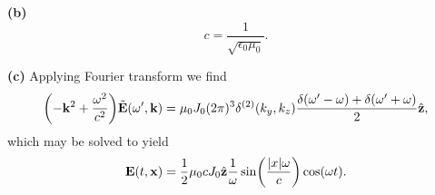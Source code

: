 \documentclass{article}
\makeatletter
\newcommand*{\shifttext}[1]{%
  \settowidth{\@tempdima}{#1}%
  \hspace{-\@tempdima}#1%
}
\newcommand{\plabel}[1]{%
\shifttext{\textbf{#1}\quad}%
}
\newcommand{\minusbaseline}{\abovedisplayskip=0pt\abovedisplayshortskip=0pt~\vspace*{-\baselineskip}}%
\makeatother
\begin{document}
\plabel{(b)}%
\minusbaseline%
\[ c = \frac{1}{\sqrt{\epsilon_0\mu_0}}. \]

\plabel{(c)}%
Applying Fourier transform we find
\[ \qty(-\vb{k}^2 + \frac{\omega^2}{c^2}) \tilde{\vb{E}}(\omega',\vb{k}) = \mu_0 J_0 (2\pi)^3 \delta^{(2)}(k_y,k_z)\frac{\delta(\omega'-\omega) + \delta(\omega'+\omega)}{2} \hat{\vb{z}}, \]
which may be solved to yield
\[ \vb{E}(t,\vb{x}) = \frac{1}{2} \mu_0 c J_0 \hat{\vb{z}} \frac{1}{\omega} \sin(\frac{\abs{x}\omega}{c}) \cos(\omega t). \]


% 
% 
\end{document}
